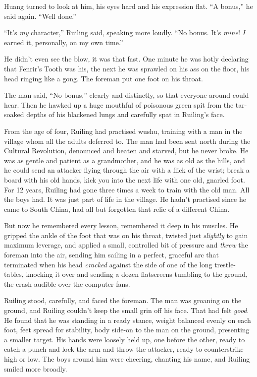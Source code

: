Huang turned to look at him, his eyes hard and his expression flat.
``A bonus,'' he said again. ``Well done.''

``It's \emph{my} character,'' Ruiling said, speaking more loudly. ``No
bonus. It's \emph{mine}! \emph{I} earned it, personally, on my own
time.''

He didn't even see the blow, it was that fast. One minute he was
hotly declaring that Fenrir's Tooth was his, the next he was
sprawled on his ass on the floor, his head ringing like a gong. The
foreman put one foot on his throat.

The man said, ``No bonus,'' clearly and distinctly, so that everyone
around could hear. Then he hawked up a huge mouthful of poisonous
green spit from the tar-soaked depths of his blackened lungs and
carefully spat in Ruiling's face.

From the age of four, Ruiling had practised wushu, training with a
man in the village whom all the adults deferred to. The man had
been sent north during the Cultural Revolution, denounced and
beaten and starved, but he never broke. He was as gentle and
patient as a grandmother, and he was as old as the hills, and he
could send an attacker flying through the air with a flick of the
wrist; break a board with his old hands, kick you into the next
life with one old, gnarled foot. For 12 years, Ruiling had gone
three times a week to train with the old man. All the boys had. It
was just part of life in the village. He hadn't practised since he
came to South China, had all but forgotten that relic of a
different China.

But now he remembered every lesson, remembered it deep in his
muscles. He gripped the ankle of the foot that was on his throat,
twisted just \emph{slightly} to gain maximum leverage, and applied
a small, controlled bit of pressure and \emph{threw} the foreman
into the air, sending him sailing in a perfect, graceful arc that
terminated when his head \emph{cracked} against the side of one of
the long trestle-tables, knocking it over and sending a dozen
flatscreens tumbling to the ground, the crash audible over the
computer fans.

Ruiling stood, carefully, and faced the foreman. The man was
groaning on the ground, and Ruiling couldn't keep the small grin
off his face. That had felt \emph{good}. He found that he was
standing in a ready stance, weight balanced evenly on each foot,
feet spread for stability, body side-on to the man on the ground,
presenting a smaller target. His hands were loosely held up, one
before the other, ready to catch a punch and lock the arm and throw
the attacker, ready to counterstrike high or low. The boys around
him were cheering, chanting his name, and Ruiling smiled more
broadly.


